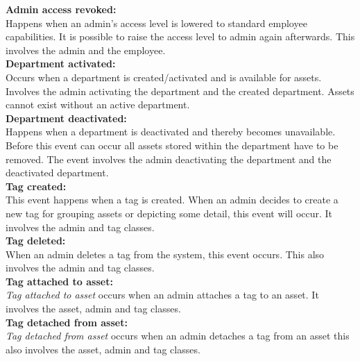 \textbf{Admin access revoked:}\\
Happens when an admin's access level is lowered to standard employee capabilities. It is possible to raise the access level to admin again afterwards. This involves the admin and the employee.\\

\textbf{Department activated:}\\
Occurs when a department is created/activated and is available for assets. Involves the admin activating the department and the created department. Assets cannot exist without an active department. \\

\textbf{Department deactivated:}\\
Happens when a department is deactivated and thereby becomes unavailable. Before this event can occur all assets stored within the department have to be removed. The event involves the admin deactivating the department and the deactivated department.\\

\textbf{Tag created:}\\
This event happens when a tag is created. When an admin decides to create a new tag for grouping assets or depicting some detail, this event will occur. It involves the admin and tag classes.\\

\textbf{Tag deleted:}\\
When an admin deletes a tag from the system, this event occurs. This also involves the admin and tag classes.\\

\textbf{Tag attached to asset:}\\
\textit{Tag attached to asset} occurs when an admin attaches a tag to an asset. It involves the asset, admin and tag classes.\\

\textbf{Tag detached from asset:}\\
\textit{Tag detached from asset} occurs when an admin detaches a tag from an asset this also involves the asset, admin and tag classes.